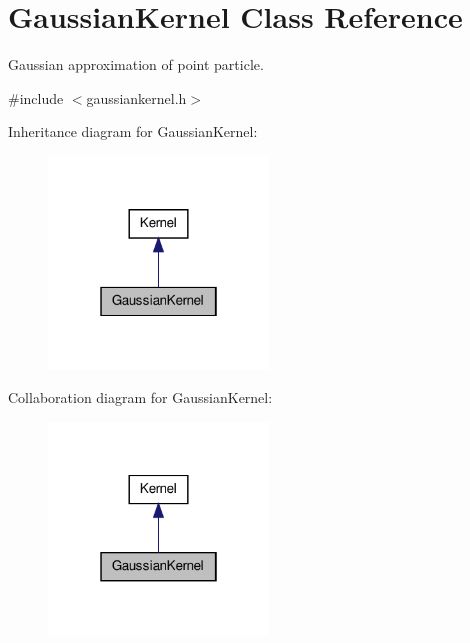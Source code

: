 \hypertarget{classGaussianKernel}{\section{\-Gaussian\-Kernel \-Class \-Reference}
\label{classGaussianKernel}
}


\-Gaussian approximation of point particle.  




{\ttfamily \#include $<$gaussiankernel.\-h$>$}



\-Inheritance diagram for \-Gaussian\-Kernel\-:\nopagebreak
\begin{figure}[H]
\begin{center}
\leavevmode
\includegraphics[width=166pt]{classGaussianKernel__inherit__graph}
\end{center}
\end{figure}


\-Collaboration diagram for \-Gaussian\-Kernel\-:\nopagebreak
\begin{figure}[H]
\begin{center}
\leavevmode
\includegraphics[width=166pt]{classGaussianKernel__coll__graph}
\end{center}
\end{figure}
